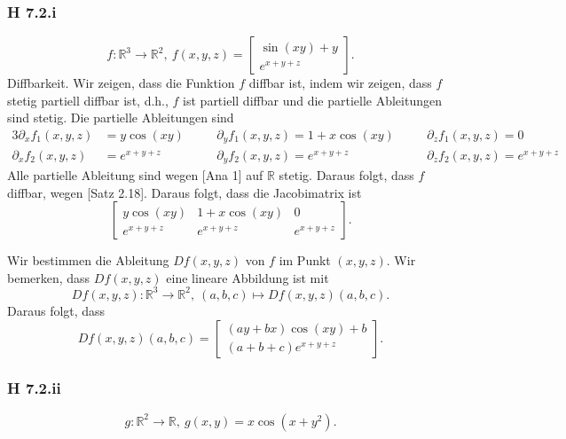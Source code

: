 \documentclass[draft,a5paper]{article}
\theoremstyle{remark}
\begin{document}
\subsubsection*{H 7.2.i}
\[f\colon \mathbb{R}^{3} \to \mathbb{R}^{2},~ f(x, y, z) =
  \begin{bmatrix}
    \sin(xy) + y \\ e^{x + y + z}
  \end{bmatrix}.
\]
Diffbarkeit.  Wir zeigen, dass die Funktion \(f\) diffbar ist, indem
wir zeigen, dass \(f\) stetig partiell diffbar ist, d.h., \(f\) ist
partiell diffbar und die partielle Ableitungen sind stetig.  Die
partielle Ableitungen sind
\begin{alignat*}{3}
\partial_{x}f_{1}(x, y, z) &= y \cos(xy) &&\quad
\partial_{y}f_{1}(x, y, z) = 1 + x \cos(xy) &&\quad
\partial_{z}f_{1}(x, y, z) = 0 \\
\partial_{x}f_{2}(x, y, z) &= e^{x + y + z} &&\quad
\partial_{y}f_{2}(x, y, z) = e^{x + y + z} &&\quad
\partial_{z}f_{2}(x, y, z) = e^{x + y + z}
\end{alignat*}
Alle partielle Ableitung sind wegen [Ana 1] auf \(\mathbb{R}\) stetig.  Daraus
folgt, dass \(f\) diffbar, wegen [Satz 2.18].
Daraus folgt, dass die Jacobimatrix ist
\[
  \begin{bmatrix}
    y \cos(xy) & 1 + x \cos(xy) & 0 \\
    e^{x + y + z} & e^{x + y + z} & e^{x + y + z}
  \end{bmatrix}.
\]

Wir bestimmen die Ableitung \(Df(x, y, z)\) von \(f\) im Punkt
\((x, y, z)\).  Wir bemerken, dass \(Df(x, y, z)\) eine lineare
Abbildung ist mit
\[
  Df(x, y, z)\colon \mathbb{R}^{3} \to \mathbb{R}^{2},~ (a, b, c) \mapsto Df(x, y, z)(a, b, c).
\]
Daraus folgt, dass \[
  Df(x, y, z)(a, b, c) =
  \begin{bmatrix}
    (ay+bx)\cos(xy) + b \\
    (a+b+c)e^{x+y+z}
  \end{bmatrix}.
\]

\subsubsection*{H 7.2.ii}
\[
  g\colon \mathbb{R}^{2} \to \mathbb{R},~ g(x, y) = x \cos(x + y^{2}).
\]
\end{document}
